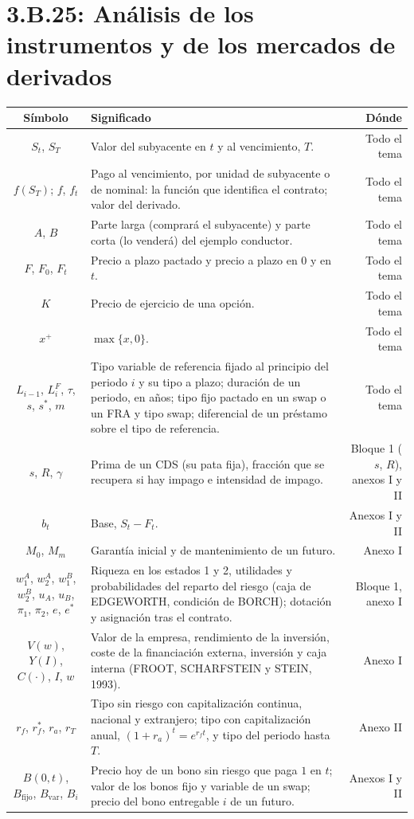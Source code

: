 \documentclass[10pt,a4paper]{article}
\newcommand{\cabecera}{\toprule\textbf{Símbolo} & \textbf{Significado} & \textbf{Dónde}\\\midrule\endhead\bottomrule\endfoot}
\begin{document}
\section{3.B.25: Análisis de los instrumentos y de los mercados de derivados}
\begin{longtable}{SMD}
\cabecera
$S_t$, $S_T$ & Valor del subyacente en $t$ y al vencimiento, $T$. & Todo el tema\\
$f(S_T)$; $f$, $f_t$ & Pago al vencimiento, por unidad de subyacente o de nominal: la función que identifica el contrato; valor del derivado. & Todo el tema\\
$A$, $B$ & Parte larga (comprará el subyacente) y parte corta (lo venderá) del ejemplo conductor. & Todo el tema\\
$F$, $F_0$, $F_t$ & Precio a plazo pactado y precio a plazo en $0$ y en $t$. & Todo el tema\\
$K$ & Precio de ejercicio de una opción. & Todo el tema\\
$x^+$ & $\max\{x,0\}$. & Todo el tema\\
$L_{i-1}$, $L^F_i$, $\tau$, $s$, $s^*$, $m$ & Tipo variable de referencia fijado al principio del periodo $i$ y su tipo a plazo; duración de un periodo, en años; tipo fijo pactado en un swap o un FRA y tipo swap; diferencial de un préstamo sobre el tipo de referencia. & Todo el tema\\
$s$, $R$, $\gamma$ & Prima de un CDS (su pata fija), fracción que se recupera si hay impago e intensidad de impago. & Bloque 1 ($s$, $R$), anexos I y II\\
$b_t$ & Base, $S_t-F_t$. & Anexos I y II\\
$M_0$, $M_m$ & Garantía inicial y de mantenimiento de un futuro. & Anexo I\\
$w_1^A$, $w_2^A$, $w_1^B$, $w_2^B$, $u_A$, $u_B$, $\pi_1$, $\pi_2$, $e$, $e^*$ & Riqueza en los estados 1 y 2, utilidades y probabilidades del reparto del riesgo (caja de EDGEWORTH, condición de BORCH); dotación y asignación tras el contrato. & Bloque 1, anexo I\\
$V(w)$, $Y(I)$, $C(\cdot)$, $I$, $w$ & Valor de la empresa, rendimiento de la inversión, coste de la financiación externa, inversión y caja interna (FROOT, SCHARFSTEIN y STEIN, 1993). & Anexo I\\
$r_f$, $r_f^*$, $r_a$, $r_T$ & Tipo sin riesgo con capitalización continua, nacional y extranjero; tipo con capitalización anual, $(1+r_a)^t=e^{r_ft}$, y tipo del periodo hasta $T$. & Anexo II\\
$B(0,t)$, $B_{\text{fijo}}$, $B_{\text{var}}$, $B_i$ & Precio hoy de un bono sin riesgo que paga $1$ en $t$; valor de los bonos fijo y variable de un swap; precio del bono entregable $i$ de un futuro. & Anexos I y II\\

\end{longtable}
\end{document}
